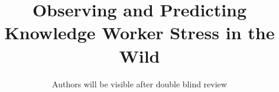 \documentclass[final,1p,times,plainnat]{elsarticle}
\begin{document}
\begin{frontmatter}

\title{Observing and Predicting Knowledge Worker Stress in the Wild}

\author{Authors will be visible after double blind review}


\begin{comment}
	
\author{Mauricio Soto}
\affiliation{%
\institution{ABB Future Labs}
\city{Raleigh}
\state{North Carolina}
}
\email{mauricio.soto@us.abb.com}

\author{Chris Satterfield}
\affiliation{%
\institution{The University of British Columbia}
\city{Vancouver}
\state{British Columbia}
}
\email{cds00@cs.ubc.ca}
	
\author{Thomas Fritz}
\affiliation{%
\institution{University of Zurich}
\city{Zurich}
\state{Switzerland}
}
\email{fritz@ifi.uzh.ch}
	
\author{Gail C. Murphy}
\affiliation{%
\institution{The University of British Columbia}
\city{Vancouver}
\state{British Columbia}
}
\email{murphy@cs.ubc.ca}
	
\author{David Shepherd}
\affiliation{%
\institution{Virginia Commonwealth University}
\city{Richmond}
\state{Virginia}
}
\email{shepherdd@vcu.edu}
	
\author{Nicholas Kraft}
\affiliation{%
\institution{UserVoice}
\city{Raleigh}
\state{North Carolina}
}
\email{kraft.nicholas.a@gmail.com} \\}
	
\end{comment}






\end{frontmatter}
\end{document}
